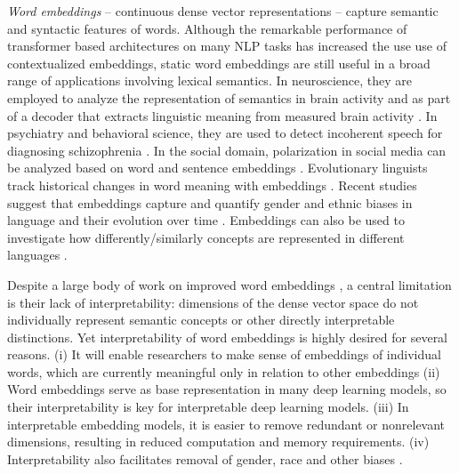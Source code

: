 \documentclass[11pt,a4paper]{article}
\begin{document}
\emph{Word embeddings} \citep{mikolov13word2vec_a,mikolov13word2vec_b,pennington14glove,bojanowski2017enriching}
-- continuous dense vector representations --
capture semantic and syntactic features
of words. 
Although the remarkable performance of transformer based
architectures
\citep{vaswani17transformers,devlin19BERT,Radford19GPT2} on
many NLP tasks has increased the use use of contextualized embeddings, static word embeddings are still useful in a broad range of applications involving lexical semantics. 
In neuroscience, they are employed to analyze the representation of semantics in brain
activity
\citep{ruan16brainActivity,huth16semanticMaps,zhang20connecting} and as part of a
decoder that extracts linguistic meaning from measured brain
activity \citep{pereira18universalDecoder}. 
In psychiatry and behavioral science, they are used to detect incoherent speech for diagnosing schizophrenia
\citep{iter2018automatic}.
In the social domain, polarization in social media \citep{demszky19analyzing} can be analyzed based on word and sentence embeddings \citep{demszky19analyzing}. 
Evolutionary linguists track historical changes in word meaning with embeddings \citep{hamilton16diachronic,kutuzov18diachronic}. 
Recent studies suggest that embeddings  capture and quantify gender and ethnic biases in language \citep{bolukbasi16debiasing,garg18gender100years,caliskan17humanLikeBiases} and their evolution over time \citep{agarwal2019word}. 
Embeddings can also be used to investigate how differently/similarly concepts are represented in different languages
\citep{senel17crossLingual,senel18atlas}.

Despite a large body of work on improved word embeddings
\citep{yu2017refining, celikyilmaz15enriching,
  yu14improving, liu15learning, mrksic16counterFitting,
  bollegala16joint, yang16fineTuning}, a central limitation
is their lack of interpretability: dimensions of the dense vector
space do not individually represent semantic concepts
\citep{chen16InfoGAN,levy14dependency} or other directly
interpretable distinctions.
Yet interpretability of word embeddings is highly desired
for several reasons. 
(i) It will enable researchers to make sense of embeddings
of individual words,  which are currently meaningful only in relation to other embeddings 
(ii) Word embeddings serve as base representation in many deep learning models, so their interpretability is key for interpretable deep learning models.
(iii) In interpretable embedding models, it is easier to remove redundant or nonrelevant dimensions, resulting in reduced computation and memory requirements.
(iv) Interpretability also facilitates removal of gender, race and other biases \citep{dufter19ultraDense}.
\end{document}
